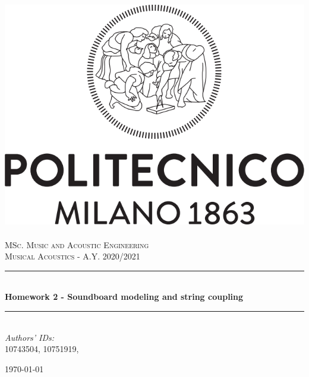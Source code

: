 \documentclass[a4paper]{article}
\title{}
\author{}
\begin{document}
\begin{titlepage}	
	\newcommand{\HRule}{\rule{\linewidth}{0.5mm}} %
	
	\center %
	
	
	\includegraphics[width=.4\textwidth]{Logo_Politecnico_Milano.png}\\[0.4cm]
	\textsc{\LARGE}\\[0.3cm] %
	
	\textsc{\large MSc. Music and Acoustic Engineering}\\[1cm] %
	
	\textsc{\Large Musical Acoustics - A.Y. 2020/2021}\\[0.5cm] %
	
	
	\HRule\\[0.4cm]
	
	{\huge\bfseries Homework 2 - Soundboard modeling and string coupling}\\[0.4cm] %
	
	\HRule\\[1.5cm]
	
	
	
	{\large\textit{Authors' IDs:}}\\
	10743504, 10751919, %
	
	
	\vfill\vfill\vfill %
	
	{\large\today} %
	

\end{titlepage}
\end{document}
